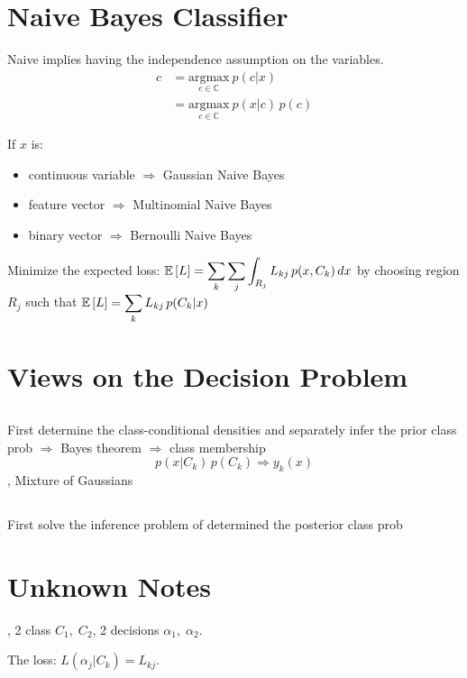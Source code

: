 \section{Naive Bayes Classifier}
Naive implies having the independence assumption on the variables.
\begin{align*}
	c 	&= \underset{c \in \mathbb{C}}{\text{argmax}}\:p(c|x)\\
		&= \underset{c \in \mathbb{C}}{\text{argmax}}\:p(x|c)\,p(c)
\end{align*}

If $x$ is:
\begin{itemize}
	\item continuous variable $\Rightarrow$ Gaussian Naive Bayes
	\item feature vector $\Rightarrow$ Multinomial Naive Bayes
	\item binary vector $\Rightarrow$ Bernoulli Naive Bayes
\end{itemize}

Minimize the expected loss: $\displaystyle \mathbb{E} \left[ L \right] = \sum_{k}\sum_{j}\int_{R_j}L_{kj}\,p(x, C_k)\,dx$ by choosing region $R_j$ such that $\displaystyle \mathbb{E} \left[ L \right] = \sum_kL_{kj}\,p(C_k| x)$

\section{Views on the Decision Problem}
\subsection{}
First determine the class-conditional densities and separately infer the prior class \ac{prob} $\Rightarrow$ Bayes theorem $\Rightarrow$ class membership
\[p(x|C_k)\,p(C_k) \Rightarrow y_k(x)\]
\Eg, Mixture of Gaussians

\subsection{}
First solve the inference problem of determined the posterior class \ac{prob}

\section{Unknown Notes}
\Eg, 2 class $C_1, \; C_2$, 2 decisions $\alpha_1, \; \alpha_2$.

The loss: $L(\alpha_j | C_k) = L_{kj}$.

